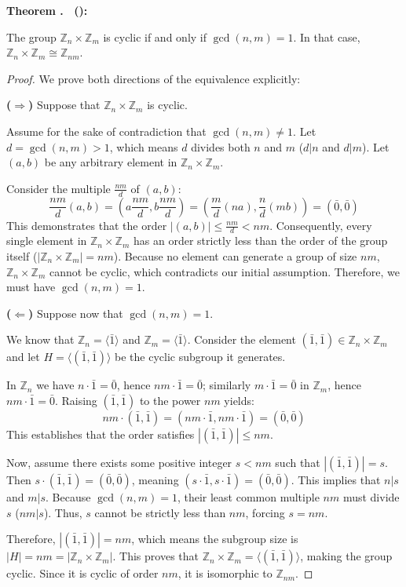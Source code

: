\documentclass[11pt,a4paper]{article}
\newcommand{\Z}{\mathbb{Z}}
\newcounter{thmcnt}[section]
\renewcommand{\thethmcnt}{\thesection.\arabic{thmcnt}}
\newenvironment{theorem}[1][]{
	\def\temp{#1}%
    \refstepcounter{thmcnt}
	\begin{theorembox}
		\textbf{\color{theoremColor}Theorem \thethmcnt%
			\ifx\temp\empty\relax\else\ (#1)\fi:} 
	}{
	\end{theorembox}
}
\begin{document}
	\begin{theorem}
		\label{thm:ZnZm}
		The group $\Z_n \times \Z_m$ is cyclic if and only if $\gcd(n,m) = 1$. In that case, $\Z_n \times \Z_m \cong \Z_{nm}$.
	\end{theorem}
	
	\begin{proof}
		We prove both directions of the equivalence explicitly:
		
		\vspace{0.5em}
		\noindent \textbf{($\Rightarrow$)} Suppose that $\Z_n \times \Z_m$ is cyclic.
		
		Assume for the sake of contradiction that $\gcd(n,m) \neq 1$. Let $d = \gcd(n,m) > 1$, which means $d$ divides both $n$ and $m$ ($d|n$ and $d|m$). Let $(a, b)$ be any arbitrary element in $\Z_n \times \Z_m$. 
		
		Consider the multiple $\frac{nm}{d}$ of $(a, b)$:
		\[
		\frac{nm}{d} (a, b) = \left( a \frac{nm}{d}, b \frac{nm}{d} \right) = \left( \frac{m}{d}(na), \frac{n}{d}(mb) \right) = (\bar{0}, \bar{0})
		\]
		This demonstrates that the order $|(a, b)| \leq \frac{nm}{d} < nm$. Consequently, every single element in $\Z_n \times \Z_m$ has an order strictly less than the order of the group itself ($|\Z_n \times \Z_m| = nm$). Because no element can generate a group of size $nm$, $\Z_n \times \Z_m$ cannot be cyclic, which contradicts our initial assumption. Therefore, we must have $\gcd(n,m) = 1$.
		
		\vspace{0.8em}
		\noindent \textbf{($\Leftarrow$)} Suppose now that $\gcd(n,m) = 1$. 
		
		We know that $\Z_n = \langle\bar{1}\rangle$ and $\Z_m = \langle\bar{1}\rangle$. Consider the element $(\bar{1}, \bar{1}) \in \Z_n \times \Z_m$ and let $H = \langle(\bar{1}, \bar{1})\rangle$ be the cyclic subgroup it generates. 
		
		In $\Z_n$ we have $n\cdot\bar{1} = \bar{0}$, hence $nm\cdot\bar{1} = \bar{0}$; similarly $m\cdot\bar{1} = \bar{0}$ in $\Z_m$, hence $nm\cdot\bar{1} = \bar{0}$. 
		Raising $(\bar{1}, \bar{1})$ to the power $nm$ yields:
		\[
		nm\cdot(\bar{1}, \bar{1}) = (nm\cdot\bar{1}, nm\cdot\bar{1}) = (\bar{0}, \bar{0})
		\]
		This establishes that the order satisfies $|(\bar{1}, \bar{1})| \leq nm$.
		
		Now, assume there exists some positive integer $s < nm$ such that $|(\bar{1}, \bar{1})| = s$. Then $s\cdot(\bar{1}, \bar{1}) = (\bar{0}, \bar{0})$, meaning $(s\cdot\bar{1}, s\cdot\bar{1}) = (\bar{0}, \bar{0})$. This implies that $n|s$ and $m|s$. Because $\gcd(n,m) = 1$, their least common multiple $nm$ must divide $s$ ($nm | s$). Thus, $s$ cannot be strictly less than $nm$, forcing $s = nm$. 
		
		Therefore, $|(\bar{1}, \bar{1})| = nm$, which means the subgroup size is $|H| = nm = |\Z_n \times \Z_m|$. This proves that $\Z_n \times \Z_m = \langle(\bar{1}, \bar{1})\rangle$, making the group cyclic. Since it is cyclic of order $nm$, it is isomorphic to $\Z_{nm}$.
	\end{proof}
	
\end{document}
